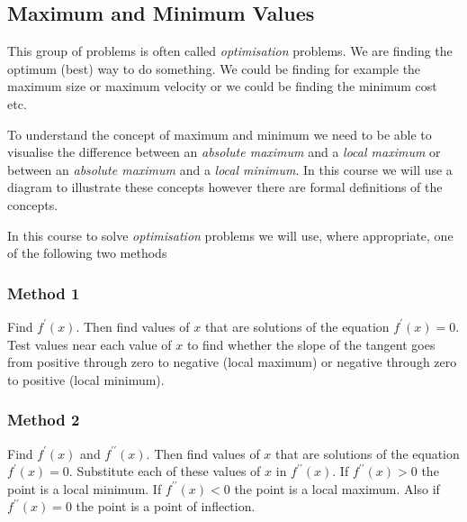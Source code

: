 \subsection{Maximum and Minimum Values}
This group of problems is often called \emph{optimisation} problems. We are finding
the optimum (best) way to do something. We could be finding for example the maximum size or maximum velocity
or we could be finding the minimum cost etc. 

To understand the concept of maximum and minimum we need to be able to visualise the
difference between an \emph{absolute maximum} and a \emph{local maximum} or between an \emph{absolute maximum}
and a \emph{local minimum}. In this course we will use a diagram to illustrate these concepts
however there are formal definitions of the concepts. 

In this course to solve \emph{optimisation} problems we will
use, where appropriate, one of the following two methods 

\subsubsection{Method 1}
Find $f^{ \prime } (x)$. Then find values of $x$ that are solutions of the equation $f^{ \prime } (x) =0$. Test values near each value of $x$ to find whether the slope of the tangent goes from positive through zero to negative (local maximum) or negative through zero
to positive (local minimum). 

\subsubsection{Method 2}
Find $f^{ \prime } (x)$ and $f^{ \prime  \prime } (x)$. Then find values of $x$ that are solutions of the equation $f^{ \prime } (x) =0$. Substitute each of these values of $x$ in $f^{ \prime  \prime } (x)$. If $f^{ \prime  \prime } (x) >0$ the point is a local minimum. If $f^{ \prime  \prime } (x) <0$ the point is a local maximum. Also if $f^{ \prime  \prime } (x) =0$ the point is a point of inflection.\vspace{1cm} 

